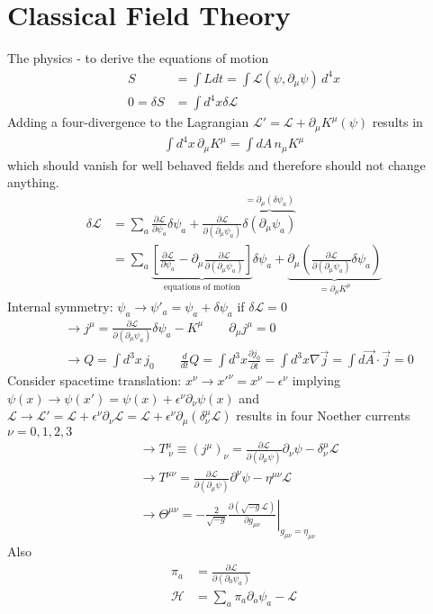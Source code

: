 \documentclass[../main.tex]{subfiles}
\begin{document}
\section{Classical Field Theory}
The physics - to derive the equations of motion 
\begin{align}
S&=\int L dt=\int\mathcal{L}(\psi,\partial_\mu\psi)\, d^4x\\
0=\delta S&=\int d^4x \delta \mathcal{L}
\end{align}
Adding a four-divergence to the Lagrangian $\mathcal{L}'=\mathcal{L}+\partial_\mu K^\mu(\psi)$ results in 
\begin{align}
\int d^4x\,\partial_\mu K^\mu=\int dA\,n_\mu K^\mu
\end{align}
which should vanish for well behaved fields and therefore should not change anything.
\begin{align}
\delta\mathcal{L}
&=\sum_a\frac{\partial\mathcal{L}}{\partial\psi_a}\delta\psi_a+\frac{\partial\mathcal{L}}{\partial(\partial_\mu\psi_a)}\overbrace{\delta(\partial_\mu\psi_a)}^{=\partial_\mu(\delta\psi_a)}\\
&=\sum_a\underbrace{\left[\frac{\partial\mathcal{L}}{\partial\psi_a}-\partial_\mu\frac{\partial\mathcal{L}}{\partial(\partial_\mu\psi_a)}\right]}_{\text{equations of motion}}\delta\psi_a+\underbrace{\partial_\mu\left(\frac{\partial\mathcal{L}}{\partial(\partial_\mu\psi_a)}\delta\psi_a\right)}_{=\partial_\mu K^\mu}
\end{align}
Internal symmetry: $\psi_a\rightarrow\psi'_a=\psi_a+\delta\psi_a$ if $\delta\mathcal{L}=0$
\begin{align}
&\rightarrow j^\mu=\frac{\partial\mathcal{L}}{\partial(\partial_\mu\psi_a)}\delta\psi_a-K^\mu\qquad\partial_\mu j^\mu=0\\
&\rightarrow Q=\int d^3x\,j_0\qquad \frac{d}{dt}Q=\int d^3x \frac{\partial j_0}{\partial t}=\int d^3x \nabla\vec{j}=\int d\vec{A}\cdot\vec{j}=0
\end{align}
Consider spacetime translation: $x^\nu\rightarrow x'^\nu=x^\nu-\epsilon^\nu$ implying $\psi(x)\rightarrow\psi(x')=\psi(x)+\epsilon^\nu\partial_\nu\psi(x)$ and $\mathcal{L}\rightarrow\mathcal{L}'=\mathcal{L}+\epsilon^\nu\partial_\nu\mathcal{L}=\mathcal{L}+\epsilon^\nu\partial_\mu(\delta^\mu_\nu\mathcal{L})$ results in four Noether currents $\nu=0,1,2,3$
\begin{align}
&\rightarrow T^\mu_{\;\nu}\equiv(j^\mu)_\nu=\frac{\partial\mathcal{L}}{\partial(\partial_\mu\psi)}\partial_\nu\psi-\delta^\mu_\nu\mathcal{L}\\
&\rightarrow T^{\mu\nu}=\frac{\partial\mathcal{L}}{\partial(\partial_\mu\psi)}\partial^\nu\psi-\eta^{\mu\nu}\mathcal{L}\\
&\rightarrow \Theta^{\mu\nu}=-\frac{2}{\sqrt{-g}}\left.\frac{\partial(\sqrt{-g}\mathcal{L})}{\partial g_{\mu\nu}}\right|_{g_{\mu\nu}=\eta_{\mu\nu}}
\end{align}
Also
\begin{align}
\pi_a&=\frac{\partial\mathcal{L}}{\partial(\partial_0\psi_a)}\\
\mathcal{H}&=\sum_a\pi_a\partial_o\psi_a-\mathcal{L}
\end{align}
\end{document}
